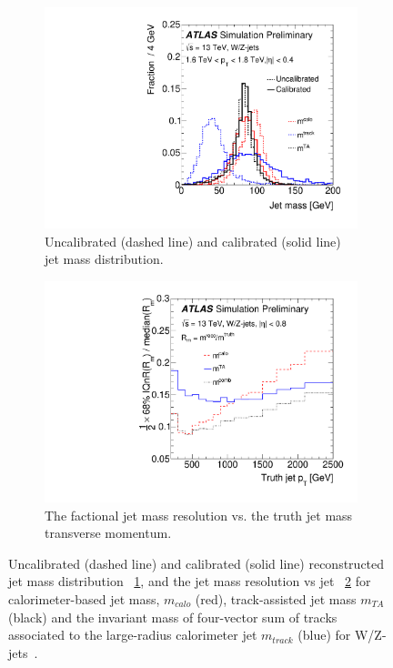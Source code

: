 \begin{figure}[h!]
  \centering
  \captionsetup{justification=centering}
	\hspace{-2cm}
    \begin{subfigure}[b]{0.45\textwidth}
        \includegraphics[width=\textwidth,angle=-90]{figures/object/Jet_mass}
        \caption{Uncalibrated (dashed line) and calibrated (solid line) jet mass distribution.}
        \label{fig:obj_jet_mass_dist}
    \end{subfigure}
    \quad
    \begin{subfigure}[b]{0.45\textwidth}
        \includegraphics[width=\textwidth,angle=-90]{figures/object/Jet_mass_resolution}
        \caption{The factional jet mass resolution vs.  the truth jet mass transverse momentum.}
        \label{fig:obj_jet_mass_resolution}
    \end{subfigure}
   \caption{Uncalibrated (dashed line) and calibrated (solid line) reconstructed jet mass distribution ~\ref{fig:obj_jet_mass_dist}, and the jet mass resolution vs jet \pt ~\ref{fig:obj_jet_mass_resolution} for calorimeter-based jet mass, $m_{calo}$ (red), track-assisted jet mass $m_{TA}$ (black) and the invariant mass of four-vector sum of tracks associated to the large-radius calorimeter jet $m_{track}$ (blue) for W/Z-jets~\cite{ATLAS-CONF-2016-035}.}
  \label{fig:obj_jet_mass}
\end{figure}

